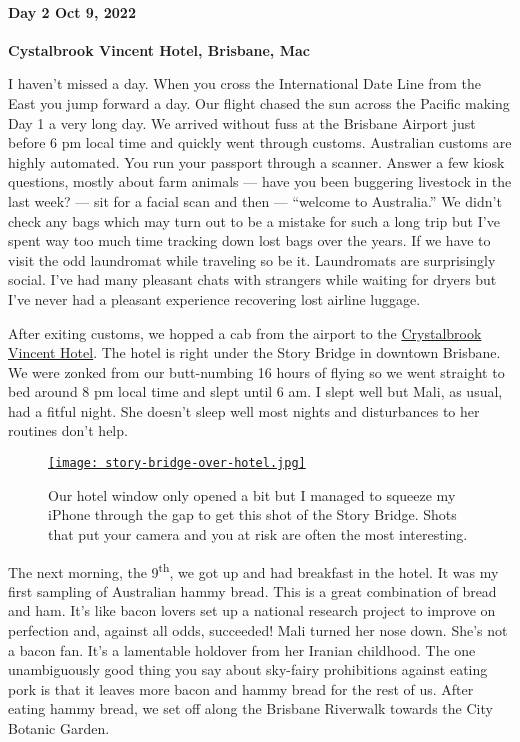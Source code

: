 \hypertarget{day-2-oct-9-2022}{%
\paragraph{\texorpdfstring{\textbf{Day 2 Oct 9,
2022}}{Day 2 Oct 9, 2022}}\label{day-2-oct-9-2022}}

\textbf{Cystalbrook Vincent Hotel, Brisbane, Mac}

I haven't missed a day. When you cross the International Date Line from
the East you jump forward a day. Our flight chased the sun across the
Pacific making Day 1 a very long day. We arrived without fuss at the
Brisbane Airport just before 6 pm local time and quickly went through
customs. Australian customs are highly automated. You run your passport
through a scanner. Answer a few kiosk questions, mostly about farm
animals --- have you been buggering livestock in the last week? --- sit
for a facial scan and then --- ``welcome to Australia.'' We didn't check
any bags which may turn out to be a mistake for such a long trip but
I've spent way too much time tracking down lost bags over the years. If
we have to visit the odd laundromat while traveling so be it.
Laundromats are surprisingly social. I've had many pleasant chats with
strangers while waiting for dryers but I've never had a pleasant
experience recovering lost airline luggage.

After exiting customs, we hopped a cab from the airport to the
\href{https://www.crystalbrookcollection.com/vincent}{Crystalbrook
Vincent Hotel}. The hotel is right under the Story Bridge in downtown
Brisbane. We were zonked from our butt-numbing 16 hours of flying so we
went straight to bed around 8 pm local time and slept until 6 am. I
slept well but Mali, as usual, had a fitful night. She doesn't sleep
well most nights and disturbances to her routines don't help.

\captionsetup[figure]{labelformat=empty}
\begin{SCfigure}
\centering
\href{https://conceptcontrol.smugmug.com/Trips/Overseas/Australia-New-Zealand-2022/i-FwCCp3L/A}{\texttt{[image: story-bridge-over-hotel.jpg]}}
\caption[Story Bridge over our hotel]{Our hotel window only opened a bit but I managed to squeeze my
iPhone through the gap to get this shot of the Story Bridge. Shots that
put your camera and you at risk are often the most interesting.}
\label{fig:7548x0}
\end{SCfigure}
 

The next morning, the 9\textsuperscript{th}, we got up and had breakfast
in the hotel. It was my first sampling of Australian hammy bread. This
is a great combination of bread and ham. It's like bacon lovers set up a
national research project to improve on perfection and, against all
odds, succeeded! Mali turned her nose down. She's not a bacon fan. It's
a lamentable holdover from her Iranian childhood. The one unambiguously
good thing you say about sky-fairy prohibitions against eating pork is
that it leaves more bacon and hammy bread for the rest of us. After
eating hammy bread, we set off along the Brisbane Riverwalk towards the
City Botanic Garden.

